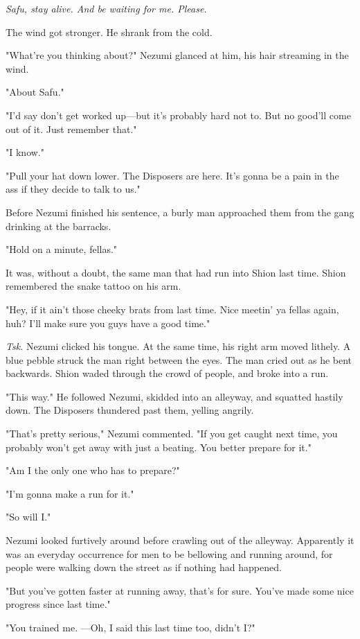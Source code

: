 \emph{Safu, stay alive. And be waiting for me. Please.}

The wind got stronger. He shrank from the cold.

"What're you thinking about?" Nezumi glanced at him, his hair streaming
in the wind.

"About Safu."

"I'd say don't get worked up---but it's probably hard not to. But no
good'll come out of it. Just remember that."

"I know."

"Pull your hat down lower. The Disposers are here. It's gonna be a pain
in the ass if they decide to talk to us."

Before Nezumi finished his sentence, a burly man approached them from
the gang drinking at the barracks.

"Hold on a minute, fellas."

It was, without a doubt, the same man that had run into Shion last time.
Shion remembered the snake tattoo on his arm.

"Hey, if it ain't those cheeky brats from last time. Nice meetin' ya
fellas again, huh? I'll make sure you guys have a good time."

\emph{Tsk.} Nezumi clicked his tongue. At the same time, his right arm moved
lithely. A blue pebble struck the man right between the eyes. The man
cried out as he bent backwards. Shion waded through the crowd of people,
and broke into a run.

"This way." He followed Nezumi, skidded into an alleyway, and squatted
hastily down. The Disposers thundered past them, yelling angrily.

"That's pretty serious," Nezumi commented. "If you get caught next time,
you probably won't get away with just a beating. You better prepare for
it."

"Am I the only one who has to prepare?"

"I'm gonna make a run for it."

"So will I."

Nezumi looked furtively around before crawling out of the alleyway.
Apparently it was an everyday occurrence for men to be bellowing and
running around, for people were walking down the street as if nothing
had happened.

"But you've gotten faster at running away, that's for sure. You've made
some nice progress since last time."

"You trained me. ---Oh, I said this last time too, didn't I?"


